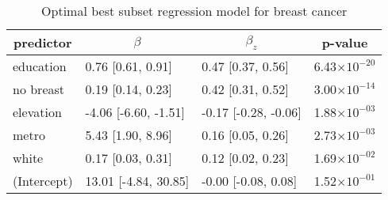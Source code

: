 %
\begin{table}[!tbp]
\caption{Optimal best subset regression model for breast cancer\label{SI_tab:breast}} 
\begin{center}
\begin{tabular}{llll}
\hline\hline
\multicolumn{1}{c}{predictor}&\multicolumn{1}{c}{$\beta$}&\multicolumn{1}{c}{$\beta_z$}&\multicolumn{1}{c}{p-value}\tabularnewline
\hline
education&0.76 [0.61, 0.91]&0.47 [0.37, 0.56]&6.43$\times10^{-20}$\tabularnewline
no breast&0.19 [0.14, 0.23]&0.42 [0.31, 0.52]&3.00$\times10^{-14}$\tabularnewline
elevation&-4.06 [-6.60, -1.51]&-0.17 [-0.28, -0.06]&1.88$\times10^{-03}$\tabularnewline
metro&5.43 [1.90, 8.96]&0.16 [0.05, 0.26]&2.73$\times10^{-03}$\tabularnewline
white&0.17 [0.03, 0.31]&0.12 [0.02, 0.23]&1.69$\times10^{-02}$\tabularnewline
(Intercept)&13.01 [-4.84, 30.85]&-0.00 [-0.08, 0.08]&1.52$\times10^{-01}$\tabularnewline
\hline
\end{tabular}
\end{center}
\end{table}

